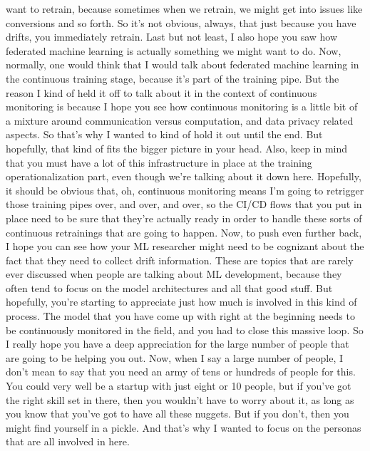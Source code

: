 {{{{{{{{    want to retrain, because sometimes when we retrain,
    we might get into issues like conversions and so forth.
    So it's not obvious, always, that just because you have drifts,
    you immediately retrain.
    Last but not least, I also hope you saw how federated machine learning is
    actually something we might want to do.
    Now, normally, one would think that I would
    talk about federated machine learning in the continuous training stage,
    because it's part of the training pipe.
    But the reason I kind of held it off to talk
    about it in the context of continuous monitoring
    is because I hope you see how continuous monitoring is
    a little bit of a mixture around communication versus computation,
    and data privacy related aspects.
    So that's why I wanted to kind of hold it out until the end.
    But hopefully, that kind of fits the bigger picture in your head.
    Also, keep in mind that you must have a lot of this infrastructure in place
    at the training operationalization part, even though we're
    talking about it down here.
    Hopefully, it should be obvious that, oh,
    continuous monitoring means I'm going to retrigger those training pipes over,
    and over, and over, so the CI/CD flows that you put in place need
    to be sure that they're actually ready in order
    to handle these sorts of continuous retrainings that are going to happen.
    Now, to push even further back, I hope you
    can see how your ML researcher might need to be cognizant about the fact
    that they need to collect drift information.
    These are topics that are rarely ever discussed
    when people are talking about ML development,
    because they often tend to focus on the model architectures and all
    that good stuff.
    But hopefully, you're starting to appreciate just how much
    is involved in this kind of process.
    The model that you have come up with right at the beginning
    needs to be continuously monitored in the field,
    and you had to close this massive loop.
    So I really hope you have a deep appreciation
    for the large number of people that are going to be helping you out.
    Now, when I say a large number of people,
    I don't mean to say that you need an army of tens or hundreds of people
    for this.
    You could very well be a startup with just eight or 10 people,
    but if you've got the right skill set in there,
    then you wouldn't have to worry about it, as long as you know that you've
    got to have all these nuggets.
    But if you don't, then you might find yourself in a pickle.
    And that's why I wanted to focus on the personas that are all involved in here.
}}}}}}}}
